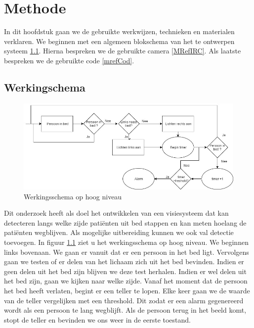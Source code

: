 \chapter{Methode}
In dit hoofdstuk gaan we de gebruikte werkwijzen, technieken en materialen verklaren. We beginnen met een algemeen blokschema van het te ontwerpen systeem \ref{MRefWeS}. Hierna bespreken we de gebruikte camera \ref{MRefIRC}. Als laatste bespreken we de gebruikte code \ref{mrefCod}.

\section{Werkingschema}
\label{MRefWeS}
\begin{figure}[hbp]
	\includegraphics[scale=0.5]{HoogNiveauBlokDiagram}
	\caption{Werkingsschema op hoog niveau}
	\label{imgWeS}
\end{figure}
Dit onderzoek heeft als doel het ontwikkelen van een visiesysteem dat kan detecteren langs welke zijde pati\"enten uit bed stappen en kan meten hoelang de pati\"enten wegblijven. Als mogelijke uitbereiding kunnen we ook val detectie toevoegen. In figuur \ref{imgWeS} ziet u het werkingsschema op hoog niveau.
We beginnen links bovenaan. We gaan er vanuit dat er een persoon in het bed ligt. Vervolgens gaan we testen of er delen van het lichaam zich uit het bed bevinden. Indien er geen delen uit het bed zijn blijven we deze test herhalen. Indien er wel delen uit het bed zijn, gaan we kijken naar welke zijde. Vanaf het moment dat de persoon het bed heeft verlaten, begint er een teller te lopen. Elke keer gaan we de waarde van de teller vergelijken met een threshold. Dit zodat er een alarm gegenereerd wordt als een persoon te lang wegblijft. Als de persoon terug in het beeld komt, stopt de teller en bevinden we ons weer in de eerste toestand.

